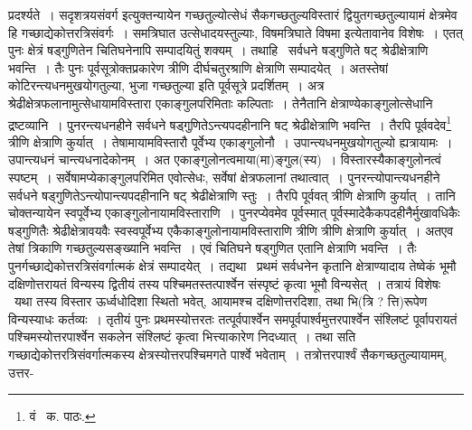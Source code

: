 \documentclass[11pt, openany]{book}
\begin{document}
\noindent प्रदर्श्यते~। {\qt सदृशत्रयसंवर्ग} इत्युक्तन्यायेन गच्छतुल्योत्सेधं सैकगच्छतुल्यविस्तारं द्वियुतगच्छतुल्यायामं क्षेत्रमेव हि गच्छाद्येकोत्तरत्रिसंवर्गः~। समत्रिघात उत्सेधादयस्तुल्याः, विषमत्रिघाते विषमा इत्येतावानेव विशेषः~। एतत् पुनः क्षेत्रं षड्गुणितेन चितिघनेनापि सम्पादयितुं शक्यम्~। तथाहि \textendash\ सर्वधने षड्गुणिते षट् श्रेढीक्षेत्राणि भवन्ति~। तैः पुनः पूर्वसूत्रोक्तप्रकारेण त्रीणि दीर्घचतुरश्राणि क्षेत्राणि सम्पादयेत्~। अतस्तेषां कोटिरन्त्यधनमुखयोगतुल्या, भुजा गच्छतुल्या इति पूर्वसूत्रे प्रदर्शितम्~। अत्र श्रेढीक्षेत्रफलानामुत्सेधायामविस्तारा एकाङ्गुलपरिमिताः कल्पिताः~। तेनैतानि क्षेत्राण्येकाङ्गुलोत्सेधानि द्रष्टव्यानि~। पुनरन्त्यधनहीने सर्वधने षड्गुणितेऽन्त्यपदहीनानि षट् श्रेढीक्षेत्राणि भवन्ति~। तैरपि पूर्ववदेव\renewcommand{\thefootnote}{१}\footnote{वं \textendash\ क. पाठः.} त्रीणि क्षेत्राणि कुर्यात्~। तेषामायामविस्तारौ पूर्वेभ्य एकाङ्गुलोनौ~। उपान्त्यधनमुखयोगतुल्यो ह्यत्रायामः~। उपान्त्यधनं चान्त्यधनादेकोनम्~। अत एकाङ्गुलोनत्वमाया(मा)ङ्गुल(स्य)~। विस्तारस्यैकाङ्गुलोनत्वं स्पष्टम्~। सर्वेषामप्येकाङ्गुलपरिमित एवोत्सेधः, सर्वेषां क्षेत्रफलानां तथात्वात्~। पुनरन्त्योपान्त्यधनहीने सर्वधने षड्गुणितेऽन्त्योपान्त्यपदहीनानि षट् श्रेढीक्षेत्राणि स्तुः~। तैरपि पूर्ववत् त्रीणि
क्षेत्राणि कुर्यात्~। तानि चोक्तन्यायेन स्वपूर्वेभ्य एकाङ्गुलोनायामविस्ताराणि~। पुनरप्येवमेव पूर्वस्मात् पूर्वस्मादेकैकपदहीनैर्मुखावधिकैः षड्गुणितैः
श्रेढीक्षेत्रावयवैः स्वस्वपूर्वेभ्य एकैकाङ्गुलोनायामविस्ताराणि त्रीणि त्रीणि क्षेत्राणि कुर्यात्~। अतएव तेषां त्रिकाणि गच्छतुल्यसङ्ख्यानि भवन्ति~। एवं चितिघने षड्गुणित एतानि क्षेत्राणि भवन्ति~। तैः पुनर्गच्छाद्येकोत्तरत्रिसंवर्गात्मकं क्षेत्रं सम्पादयेत्~। तद्यथा \textendash\ प्रथमं सर्वधनेन कृतानि क्षेत्राण्यादाय तेष्वेकं भूमौ दक्षिणोत्तरायतं विन्यस्य द्वितीयं तस्य पश्चिमतस्तत्पार्श्वेन संस्पृष्टं कृत्वा भूमौ विन्यसेत्~। तत्रायं विशेषः \textendash\ यथा तस्य विस्तार ऊर्ध्वधोदिशा स्थितो भवेत्, आयामश्च दक्षिणोत्तरदिशा, तथा भि(त्रि ? त्ति)रूपेण विन्यस्याधः कर्तव्यः~। तृतीयं पुनः प्रथमस्योत्तरतः तत्पूर्वपार्श्वेन समपूर्वपार्श्वमुत्तरपार्श्वेन संश्लिष्टं पूर्वापरायतं पश्चिमस्योत्तरपार्श्वेन सकलेन संश्लिष्टं कृत्वा भित्त्याकारेण निदध्यात्~। तथा सति गच्छाद्येकोत्तरत्रिसंवर्गात्मकस्य क्षेत्रस्योत्तरपश्चिमगते पार्श्वे भवेताम्~। तत्रोत्तरपार्श्वं सैकगच्छतुल्यायामम्, उत्तर-

\newpage
\end{document}
